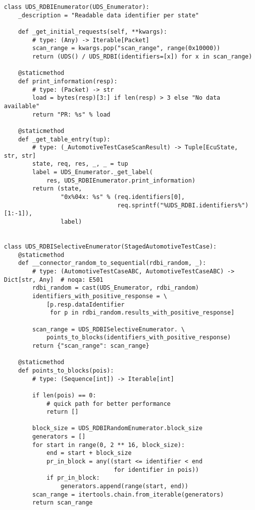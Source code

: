 \begin{verbatim}
class UDS_RDBIEnumerator(UDS_Enumerator):
    _description = "Readable data identifier per state"

    def _get_initial_requests(self, **kwargs):
        # type: (Any) -> Iterable[Packet]
        scan_range = kwargs.pop("scan_range", range(0x10000))
        return (UDS() / UDS_RDBI(identifiers=[x]) for x in scan_range)

    @staticmethod
    def print_information(resp):
        # type: (Packet) -> str
        load = bytes(resp)[3:] if len(resp) > 3 else "No data available"
        return "PR: %s" % load

    @staticmethod
    def _get_table_entry(tup):
        # type: (_AutomotiveTestCaseScanResult) -> Tuple[EcuState, str, str]
        state, req, res, _, _ = tup
        label = UDS_Enumerator._get_label(
            res, UDS_RDBIEnumerator.print_information)
        return (state,
                "0x%04x: %s" % (req.identifiers[0],
                                req.sprintf("%UDS_RDBI.identifiers%")[1:-1]),
                label)


class UDS_RDBISelectiveEnumerator(StagedAutomotiveTestCase):
    @staticmethod
    def __connector_random_to_sequential(rdbi_random, _):
        # type: (AutomotiveTestCaseABC, AutomotiveTestCaseABC) -> Dict[str, Any]  # noqa: E501
        rdbi_random = cast(UDS_Enumerator, rdbi_random)
        identifiers_with_positive_response = \
            [p.resp.dataIdentifier
             for p in rdbi_random.results_with_positive_response]

        scan_range = UDS_RDBISelectiveEnumerator. \
            points_to_blocks(identifiers_with_positive_response)
        return {"scan_range": scan_range}

    @staticmethod
    def points_to_blocks(pois):
        # type: (Sequence[int]) -> Iterable[int]

        if len(pois) == 0:
            # quick path for better performance
            return []

        block_size = UDS_RDBIRandomEnumerator.block_size
        generators = []
        for start in range(0, 2 ** 16, block_size):
            end = start + block_size
            pr_in_block = any((start <= identifier < end
                               for identifier in pois))
            if pr_in_block:
                generators.append(range(start, end))
        scan_range = itertools.chain.from_iterable(generators)
        return scan_range


\end{verbatim}
